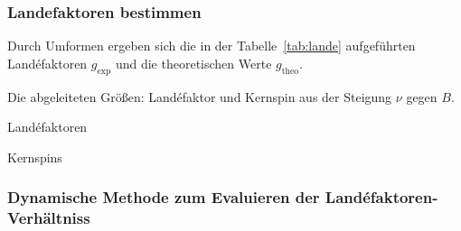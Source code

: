 \subsubsection{Landefaktoren bestimmen}%
\label{sub:landefaktoren_bestimmen}

Durch Umformen ergeben sich die in der Tabelle~\ref{tab:lande} aufgeführten
Land\'efaktoren $g_\text{exp}$ und die theoretischen Werte $g_\text{theo}$.
\begin{table}[h]
	\centering
	\caption{Die abgeleiteten Größen: Land\'efaktor und Kernspin aus der Steigung
	$\nu$ gegen $B$.}%
	\label{tab:lande}
	\begin{subtable}[t]{0.4\textwidth}
	\centering
	\caption{Land\'efaktoren}%
	\label{tab:label}
	
	\end{subtable}
	\begin{subtable}[t]{0.4\textwidth}
	\centering
	\caption{Kernspins}%
	\label{tab:label}
	
	\end{subtable}
\end{table}

\subsubsection{Dynamische Methode zum Evaluieren der Land\'efaktoren-Verhältniss}%
\label{ssub:dynamisch}

